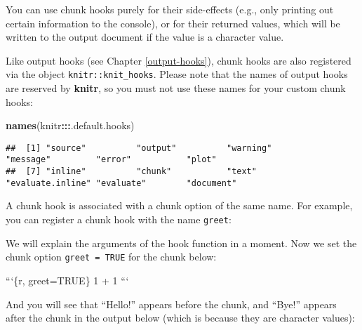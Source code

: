 \documentclass[
  11pt,
]{krantz}
\newenvironment{Shaded}{\begin{snugshade}}{\end{snugshade}}
\newcommand{\BaseNTok}[1]{\textcolor[rgb]{0.06,0.06,0.06}{#1}}
\newcommand{\ControlFlowTok}[1]{\textcolor[rgb]{0.27,0.27,0.27}{\textbf{#1}}}
\newcommand{\DataTypeTok}[1]{\textcolor[rgb]{0.27,0.27,0.27}{#1}}
\newcommand{\KeywordTok}[1]{\textcolor[rgb]{0.27,0.27,0.27}{\textbf{#1}}}
\newcommand{\NormalTok}[1]{#1}
\newcommand{\OperatorTok}[1]{\textcolor[rgb]{0.43,0.43,0.43}{\textbf{#1}}}
\newcommand{\StringTok}[1]{\textcolor[rgb]{0.5,0.5,0.5}{#1}}
\begin{document}
You can use chunk hooks purely for their side-effects (e.g., only printing out certain information to the console), or for their returned values, which will be written to the output document if the value is a character value.

Like output hooks (see Chapter \ref{output-hooks}), chunk hooks are also registered via the object \texttt{knitr::knit\_hooks}. Please note that the names of output hooks are reserved by \textbf{knitr}, so you must not use these names for your custom chunk hooks:

\begin{Shaded}
\begin{Highlighting}[]
\KeywordTok{names}\NormalTok{(knitr}\OperatorTok{:::}\NormalTok{.default.hooks)}
\end{Highlighting}
\end{Shaded}

\begin{verbatim}
##  [1] "source"          "output"          "warning"         "message"         "error"           "plot"           
##  [7] "inline"          "chunk"           "text"            "evaluate.inline" "evaluate"        "document"
\end{verbatim}

A chunk hook is associated with a chunk option of the same name. For example, you can register a chunk hook with the name \texttt{greet}:

\begin{Shaded}
\end{Shaded}

We will explain the arguments of the hook function in a moment. Now we set the chunk option \texttt{greet\ =\ TRUE} for the chunk below:

\begin{Shaded}
\begin{Highlighting}[]
\BaseNTok{```\{r, greet=TRUE\}}
\BaseNTok{1 + 1}
\BaseNTok{```}
\end{Highlighting}
\end{Shaded}

And you will see that ``Hello!'' appears before the chunk, and ``Bye!'' appears after the chunk in the output below (which is because they are character values):
\end{document}
